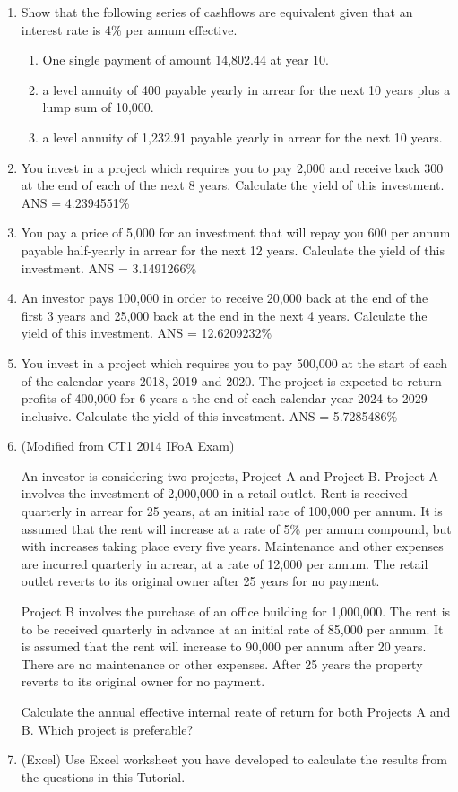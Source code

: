\documentclass[
]{article}
\theoremstyle{definition}
\theoremstyle{definition}
\theoremstyle{definition}
\theoremstyle{definition}
\theoremstyle{remark}
\begin{document}
\begin{enumerate}
\def\labelenumi{\arabic{enumi}.}
\item
  Show that the following series of cashflows are equivalent given
  that an interest rate is 4\% per annum effective.

  \begin{enumerate}
  \def\labelenumii{\arabic{enumii}.}
  \item
    One single payment of amount 14,802.44 at year 10.
  \item
    a level annuity of 400 payable yearly in arrear for the next 10
    years plus a lump sum of 10,000.
  \item
    a level annuity of 1,232.91 payable yearly in arrear for the
    next 10 years.
  \end{enumerate}
\item
  You invest in a project which requires you to pay 2,000 and receive
  back 300 at the end of each of the next 8 years. Calculate the yield
  of this investment. ANS = 4.2394551\%
\item
  You pay a price of 5,000 for an investment that will repay you 600
  per annum payable half-yearly in arrear for the next 12 years.
  Calculate the yield of this investment. ANS = 3.1491266\%
\item
  An investor pays 100,000 in order to receive 20,000 back at the end
  of the first 3 years and 25,000 back at the end in the next 4 years.
  Calculate the yield of this investment. ANS = 12.6209232\%
\item
  You invest in a project which requires you to pay 500,000 at the
  start of each of the calendar years 2018, 2019 and 2020. The project
  is expected to return profits of 400,000 for 6 years a the end of
  each calendar year 2024 to 2029 inclusive. Calculate the yield of
  this investment. ANS = 5.7285486\%
\item
  (Modified from CT1 2014 IFoA Exam)

  An investor is considering two projects, Project A and Project B.
  Project A involves the investment of 2,000,000 in a retail outlet.
  Rent is received quarterly in arrear for 25 years, at an initial
  rate of 100,000 per annum. It is assumed that the rent will increase
  at a rate of 5\% per annum compound, but with increases taking place
  every five years. Maintenance and other expenses are incurred
  quarterly in arrear, at a rate of 12,000 per annum. The retail
  outlet reverts to its original owner after 25 years for no payment.

  Project B involves the purchase of an office building for 1,000,000.
  The rent is to be received quarterly in advance at an initial rate
  of 85,000 per annum. It is assumed that the rent will increase to
  90,000 per annum after 20 years. There are no maintenance or other
  expenses. After 25 years the property reverts to its original owner
  for no payment.

  Calculate the annual effective internal reate of return for both
  Projects A and B. Which project is preferable?
\item
  (Excel) Use Excel worksheet you have developed to calculate the
  results from the questions in this Tutorial.
\end{enumerate}
\end{document}
